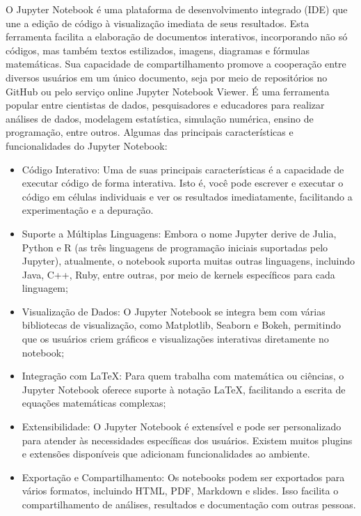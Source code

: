\documentclass[letterpaper,10pt,english]{jupyterBook}
\begin{document}
\sphinxAtStartPar
O Jupyter Notebook é uma plataforma de desenvolvimento integrado (IDE) que une a edição de código à visualização imediata de seus resultados. Esta ferramenta facilita a elaboração de documentos interativos, incorporando não só códigos, mas também textos estilizados, imagens, diagramas e fórmulas matemáticas. Sua capacidade de compartilhamento promove a cooperação entre diversos usuários em um único documento, seja por meio de repositórios no GitHub ou pelo serviço online Jupyter Notebook Viewer. É uma ferramenta popular entre cientistas de dados, pesquisadores e educadores para realizar análises de dados, modelagem estatística, simulação numérica, ensino de programação, entre outros.
Algumas das principais características e funcionalidades do Jupyter Notebook:
\begin{itemize}
\item {} 
\sphinxAtStartPar
Código Interativo: Uma de suas principais características é a capacidade de executar código de forma interativa. Isto é, você pode escrever e executar o código em células individuais e ver os resultados imediatamente, facilitando a experimentação e a depuração.

\item {} 
\sphinxAtStartPar
Suporte a Múltiplas Linguagens: Embora o nome Jupyter derive de Julia, Python e R (as três linguagens de programação iniciais suportadas pelo Jupyter), atualmente, o notebook suporta muitas outras linguagens, incluindo Java, C++, Ruby, entre outras, por meio de kernels específicos para cada linguagem;

\item {} 
\sphinxAtStartPar
Visualização de Dados: O Jupyter Notebook se integra bem com várias bibliotecas de visualização, como Matplotlib, Seaborn e Bokeh, permitindo que os usuários criem gráficos e visualizações interativas diretamente no notebook;

\item {} 
\sphinxAtStartPar
Integração com LaTeX: Para quem trabalha com matemática ou ciências, o Jupyter Notebook oferece suporte à notação LaTeX, facilitando a escrita de equações matemáticas complexas;

\item {} 
\sphinxAtStartPar
Extensibilidade: O Jupyter Notebook é extensível e pode ser personalizado para atender às necessidades específicas dos usuários. Existem muitos plugins e extensões disponíveis que adicionam funcionalidades ao ambiente.

\item {} 
\sphinxAtStartPar
Exportação e Compartilhamento: Os notebooks podem ser exportados para vários formatos, incluindo HTML, PDF, Markdown e slides. Isso facilita o compartilhamento de análises, resultados e documentação com outras pessoas.


\end{itemize}
\end{document}
